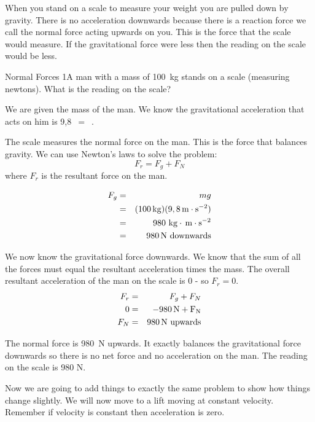 When you stand on a scale to measure your weight you are pulled down by gravity. There is no acceleration downwards because there is a reaction force we call the normal force acting upwards on you. This is the force that the scale would measure. If the gravitational force were less then the reading on the scale would be less.
\clearpage
\begin{wex}{Normal Forces 1}{A man with a mass of 100~kg stands on a scale
(measuring newtons). What is the reading on the scale?}{ We are given the mass of the man. We know the gravitational acceleration that acts on him is 9,8~$=$~\mss .

The scale measures the normal force on the man. This is the force that
balances gravity. We can use Newton's laws to solve the problem:
\begin{equation*}
F_r=F_g+F_N
\end{equation*}
where $F_r$ is the resultant force on the man.

\begin{eqnarray*}
F_g&=&mg \\
&=& (100\,\mathrm{kg})(9,8\,\mathrm{m \cdot s^{-2}})\\
&=& 980\ \mathrm{kg\cdot\,\mathrm{m \cdot s^{-2}}} \\
&=& 980\,\rm{N}\ \mathrm{downwards}
\end{eqnarray*}

We now know the gravitational force downwards. We know that the sum of all the forces must equal the resultant acceleration times the mass. The overall resultant acceleration of the man on the scale is $0$ - so $F_r=0$.
\begin{eqnarray*}
F_r&=&F_g+F_N \\
0 &=& -980\,\rm{N}+F_N\\
F_N &=& 980\,\rm{N}\ \mathrm{upwards}
\end{eqnarray*}

The normal force is 980~N upwards. It exactly balances the gravitational force downwards so there is no net force and no acceleration on the man. The reading on the scale is 980 N.}
\end{wex}

Now we are going to add things to exactly the same problem to show how things change slightly. We will now move to a lift moving at constant velocity. Remember if velocity is constant then acceleration is zero.

